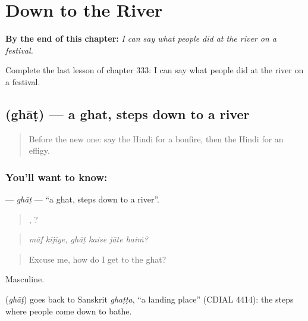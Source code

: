 
\chapter{Down to the River}
\label{ch:hi-down-to-the-river}

\begin{chapteropening}
\textbf{By the end of this chapter:} \emph{I can say what people did at the river on a festival.}

Complete the last lesson of chapter 333: I can say what people did at the river on a festival.
\end{chapteropening}

\section[\texorpdfstring{\hi{घाट} (ghāṭ)}{घाट (ghāṭ)}]{ (ghāṭ) — a ghat, steps down to a river}

\label{lesson:HI-C333-ghat}



\begin{quote}
Before the new one: say the Hindi for a bonfire, then the Hindi for an effigy.
\end{quote}

\subsection*{You'll want to know: }
\textbf{} — \emph{ghāṭ} — \textquotedblleft{}a ghat, steps down to a river\textquotedblright{}.

\begin{quote}
 ,    ?
\end{quote}

\begin{quote}
\emph{māf kījiye, ghāṭ kaise jāte haiṁ?}
\end{quote}

\begin{quote}
Excuse me, how do I get to the ghat?
\end{quote}

Masculine.

\begin{cousinweb}
\textbf{} (\emph{ghāṭ}) goes back to Sanskrit \emph{ghaṭṭa}, \textquotedblleft{}a landing place\textquotedblright{} (CDIAL 4414): the steps where people come down to bathe.
\end{cousinweb}

